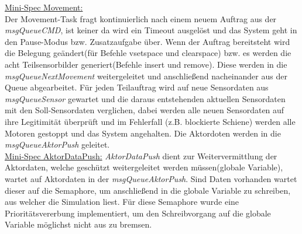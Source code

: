 \underline{Mini-Spec Movement:}\\
Der Movement-Task fragt kontinuierlich nach einem neuem Auftrag aus der \textit{msgQueueCMD}, ist keiner da wird ein Timeout ausgelöst und das System geht in den Pause-Modus bzw. Zusatzaufgabe über. Wenn der Auftrag bereitsteht wird die Belegung geändert(für Befehle vsetspace und clearspace) bzw. es werden die acht Teilsensorbilder generiert(Befehle insert und remove). Diese werden in die \textit{msgQueueNextMovement} weitergeleitet und anschließend nacheinander aus der Queue abgearbeitet. Für jeden Teilauftrag wird auf neue Sensordaten aus \textit{msgQueueSensor} gewartet und die daraus entstehenden aktuellen Sensordaten mit den Soll-Sensordaten verglichen, dabei werden alle neuen Sensordaten auf ihre Legitimität überprüft und im Fehlerfall (z.B. blockierte Schiene) werden alle Motoren gestoppt und das System angehalten. Die Aktordoten werden in die \textit{msgQueueAktorPush} geleitet. \\

\underline{Mini-Spec AktorDataPush:}
\textit{AktorDataPush} dient zur Weitervermittlung der Aktordaten, welche geschützt weitergeleitet werden müssen(globale Variable),
wartet auf Aktordaten in der \textit{msgQueueAktorPush}. Sind Daten vorhanden wartet dieser auf die Semaphore, um anschließend in die globale Variable zu schreiben, aus welcher die Simulation liest. Für diese Semaphore wurde eine Prioritätsvererbung implementiert, um den Schreibvorgang auf die globale Variable möglichst nicht aus zu bremsen. \\
